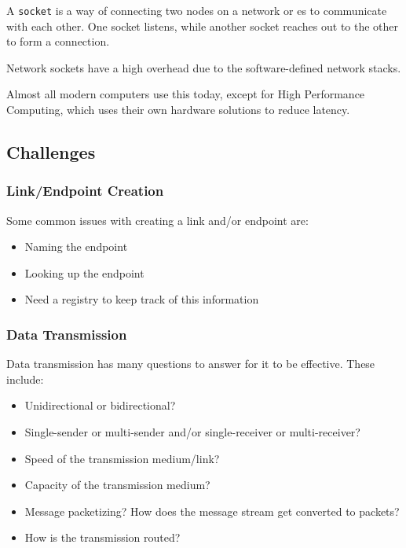 \begin{definition}[Socket]\label{def:Socket}
  A \texttt{socket} is a way of connecting two nodes on a network or es to communicate with each other.
  One socket listens, while another socket reaches out to the other to form a connection.

  Network sockets have a high overhead due to the software-defined network stacks.
\end{definition}

Almost all modern computers use this today, except for High Performance Computing, which uses their own hardware solutions to reduce latency.

\subsection{Challenges}\label{subsec:IPC_Challenges}
\subsubsection{Link/Endpoint Creation}\label{subsubsec:Link_Endpoint_Creation}
Some common issues with creating a link and/or endpoint are:
\begin{itemize}[noitemsep]
\item Naming the endpoint
\item Looking up the endpoint
\item Need a registry to keep track of this information
\end{itemize}

\subsubsection{Data Transmission}\label{subsubsec:IPC_Challenge-Data_Transmission}
Data transmission has many questions to answer for it to be effective.
These include:
\begin{itemize}[noitemsep]
\item Unidirectional or bidirectional?
\item Single-sender or multi-sender and/or single-receiver or multi-receiver?
\item Speed of the transmission medium/link?
\item Capacity of the transmission medium?
\item Message packetizing? How does the message stream get converted to packets?
\item How is the transmission routed?
\end{itemize}

